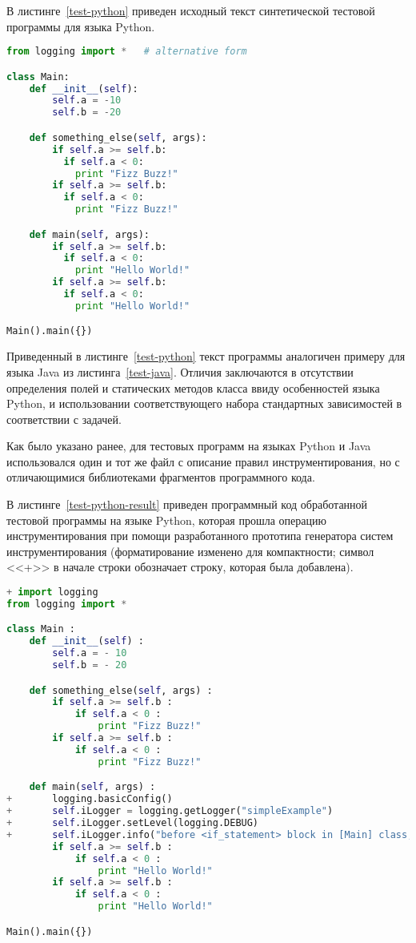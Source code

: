 В листинге~\ref{test-python} приведен исходный текст синтетической тестовой программы для языка Python.

\begin{lstlisting}[frame=single, language=Python, label={test-python}, caption={Исходный текст тестового приложения.}]
from logging import *   # alternative form

class Main:
    def __init__(self):
        self.a = -10
        self.b = -20

    def something_else(self, args):
        if self.a >= self.b:
          if self.a < 0:
            print "Fizz Buzz!"
        if self.a >= self.b:
          if self.a < 0:
            print "Fizz Buzz!"

    def main(self, args):
        if self.a >= self.b:
          if self.a < 0:
            print "Hello World!"
        if self.a >= self.b:
          if self.a < 0:
            print "Hello World!"

Main().main({})
\end{lstlisting}

Приведенный в листинге~\ref{test-python} текст программы аналогичен примеру для языка Java из листинга~\ref{test-java}.
Отличия заключаются в отсутствии определения полей и статических методов класса ввиду особенностей языка Python, и использовании соответствующего набора стандартных зависимостей в соответствии с задачей.

Как было указано ранее, для тестовых программ на языках Python и Java использовался один и тот же файл с описание правил инструментирования, но с отличающимися библиотеками фрагментов программного кода.

В листинге~\ref{test-python-result} приведен программный код обработанной тестовой программы на языке Python, которая прошла операцию инструментирования при помощи разработанного прототипа генератора систем инструментирования (форматирование изменено для компактности; символ <<+>> в начале строки обозначает строку, которая была добавлена).

\begin{lstlisting}[frame=single, language=Python, label={test-python-result}, caption={Текст инструментированного тестового приложения.}]
+ import logging
from logging import *

class Main :
    def __init__(self) :
        self.a = - 10
        self.b = - 20

    def something_else(self, args) :
        if self.a >= self.b :
            if self.a < 0 :
                print "Fizz Buzz!"
        if self.a >= self.b :
            if self.a < 0 :
                print "Fizz Buzz!"

    def main(self, args) :
+       logging.basicConfig()
+       self.iLogger = logging.getLogger("simpleExample")
+       self.iLogger.setLevel(logging.DEBUG)
+       self.iLogger.info("before <if_statement> block in [Main] class, in {main} method")
        if self.a >= self.b :
            if self.a < 0 :
                print "Hello World!"
        if self.a >= self.b :
            if self.a < 0 :
                print "Hello World!"

Main().main({})
\end{lstlisting}

